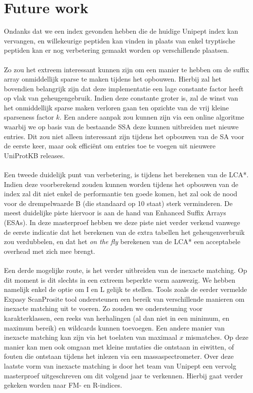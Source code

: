 \section{Future work}
Ondanks dat we een index gevonden hebben die de huidige Unipept index kan vervangen, en willekeurige peptiden kan vinden in plaats van enkel tryptische peptiden kan er nog verbetering gemaakt worden op verschillende plaatsen.
\\ \\
Zo zou het extreem interessant kunnen zijn om een manier te hebben om de suffix array onmiddellijk sparse te maken tijdens het opbouwen.
Hierbij zal het bovendien belangrijk zijn dat deze implementatie een lage constante factor heeft op vlak van geheugengebruik.
Indien deze constante groter is, zal de winst van het onmiddellijk sparse maken verloren gaan ten opzichte van de vrij kleine sparseness factor $k$.
Een andere aanpak zou kunnen zijn via een online algoritme waarbij we op basis van de bestaande SSA deze kunnen uitbreiden met nieuwe entries.
Dit zou niet alleen interessant zijn tijdens het opbouwen van de SA voor de eerste keer, maar ook efficiënt om entries toe te voegen uit nieuwere UniProtKB releases.
\\ \\
Een tweede duidelijk punt van verbetering, is tijdens het berekenen van de LCA*.
Indien deze voorberekend zouden kunnen worden tijdens het opbouwen van de index zal dit niet enkel de performantie ten goede komen, het zal ook de nood voor de drempelwaarde B (die standaard op 10 staat) sterk verminderen.
De meest duidelijke piste hiervoor is aan de hand van Enhanced Suffix Arrays (ESAs).
In deze masterproef hebben we deze piste niet verder verkend vanwege de eerste indicatie dat het berekenen van de extra tabellen het geheugenverbruik zou verdubbelen, en dat het \textit{on the fly} berekenen van de LCA* een acceptabele overhead met zich mee brengt.
\\ \\
Een derde mogelijke route, is het verder uitbreiden van de inexacte matching.
Op dit moment is dit slechts in een extreem beperkte vorm aanwezig.
We hebben namelijk enkel de optie om I en L gelijk te stellen.
Tools zoals de eerder vermelde Expasy ScanProsite tool ondersteunen een bereik van verschillende manieren om inexacte matching uit te voeren.
Zo zouden we ondersteuning voor karakterklassen, een reeks van herhalingen (al dan niet in een minimum, en maximum bereik) en wildcards kunnen toevoegen.
Een andere manier van inexacte matching kan zijn via het toelaten van maximaal $x$ mismatches.
Op deze manier kan men ook omgaan met kleine mutaties die ontstaan in eiwitten, of fouten die ontstaan tijdens het inlezen via een massaspectrometer.
Over deze laatste vorm van inexacte matching is door het team van Unipept een vervolg masterproef uitgeschreven om dit volgend jaar te verkennen.
Hierbij gaat verder gekeken worden naar FM- en R-indices.